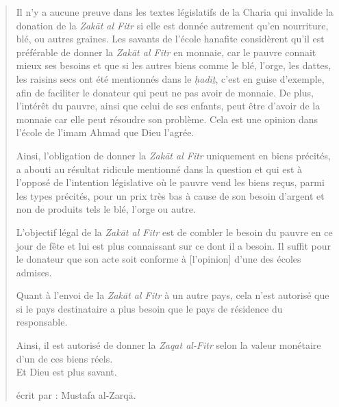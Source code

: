 \begin{quote}
Il n'y a aucune preuve dans les textes législatifs de la Charia qui
invalide la donation de la \emph{Zakāt al Fitr} si elle est donnée
autrement qu'en nourriture, blé, ou autres graines. Les savants de
l'école hanafite considèrent qu'il est préférable de donner la
\emph{Zakāt al Fitr} en monnaie, car le pauvre connait mieux ses besoins
et que si les autres biens comme le blé, l'orge, les dattes, les raisins
secs ont été mentionnés dans le \emph{ḥadīṯ}, c'est en guise d'exemple,
afin de faciliter le donateur qui peut ne pas avoir de monnaie. De plus,
l'intérêt du pauvre, ainsi que celui de ses enfants, peut être d'avoir
de la monnaie car elle peut résoudre son problème. Cela est une opinion
dans l'école de l'imam Ahmad que Dieu l'agrée.

Ainsi, l'obligation de donner la \emph{Zakāt al Fitr} uniquement en
biens précités, a abouti au résultat ridicule mentionné dans la question
et qui est à l'opposé de l'intention législative où le pauvre vend les
biens reçus, parmi les types précités, pour un prix très bas à cause de
son besoin d'argent et non de produits tels le blé, l'orge ou autre.

L'objectif légal de la \emph{Zakāt al Fitr} est de combler le besoin du
pauvre en ce jour de fête et lui est plus connaissant sur ce dont il a
besoin. Il suffit pour le donateur que son acte soit conforme à
{[}l'opinion{]} d'une des écoles admises.

Quant à l'envoi de la \emph{Zakāt al Fitr} à un autre pays, cela n'est
autorisé que si le pays destinataire a plus besoin que le pays de
résidence du responsable.

Ainsi, il est autorisé de donner la \emph{Zaqat al-Fitr} selon la valeur
monétaire d'un de ces biens réels.\\
Et Dieu est plus savant.

écrit par : Mustafa al-Zarqā.
\end{quote}
